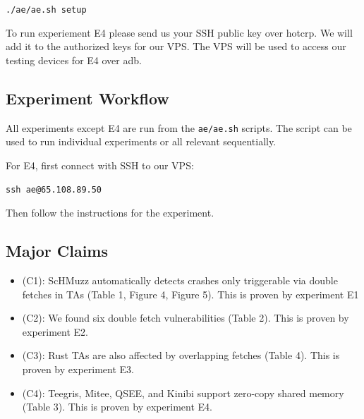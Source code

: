 \documentclass[conference]{IEEEtran}
\begin{document}
\texttt{./ae/ae.sh setup}


To run experiement E4 please send us your SSH public key over hotcrp. 
We will add it to the authorized keys for our VPS. The VPS 
will be used to access our testing devices for E4 over adb. 

\subsection{Experiment Workflow}

All experiments except E4 are run from the \texttt{ae/ae.sh} scripts. 
The script can be used to run individual experiments or all relevant sequentially. 

For E4, first connect with SSH to our VPS: 

\small
\texttt{ssh ae@65.108.89.50}
\normalsize 

Then follow the instructions for the experiment.

\subsection{Major Claims}


\begin{itemize}
    \item (C1): ScHMuzz automatically detects crashes only triggerable via double fetches in TAs (Table 1, Figure 4, Figure 5). This is proven by experiment E1
    \item (C2): We found six double fetch vulnerabilities (Table 2). This is proven by experiment E2.
    \item (C3): Rust TAs are also affected by overlapping fetches (Table 4). This is proven by experiment E3.
    \item (C4): Teegris, Mitee, QSEE, and Kinibi support zero-copy shared memory (Table 3). This is proven by experiment E4.
\end{itemize}
\end{document}
